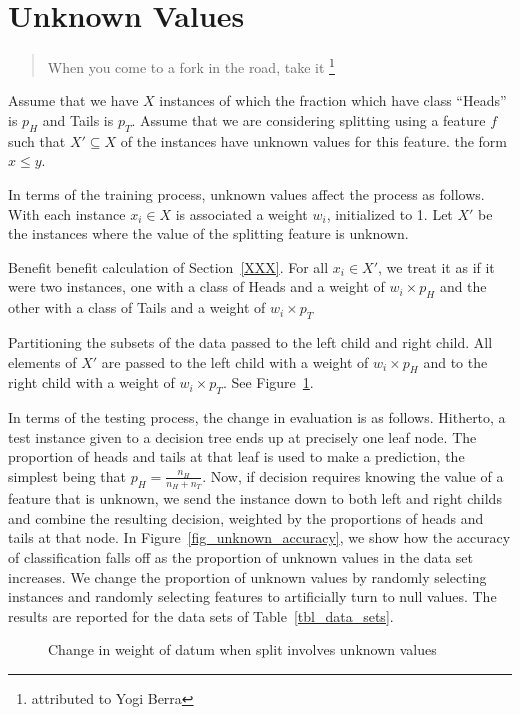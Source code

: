 \section{Unknown Values}
\label{unknowns}

\begin{quote}
When you come to a fork in the road, take it \footnote{attributed to Yogi Berra}
\end{quote}
Assume that we have \(X\) instances of which the fraction which have class
``Heads'' is \(p_H\) and Tails is \(p_T\).
Assume that we are considering splitting using
a feature \(f\) such that \(X' \subseteq X\) of the instances have unknown
values for this feature. 
the form \(x \leq y\). 

In terms of the training process, unknown values affect the process 
as follows.  With each instance \(x_i \in X\) is associated a weight \(w_i\),
initialized to 1. Let \(X'\) be the instances where the value of the splitting feature is unknown.

\be
\item Benefit benefit calculation of Section~\ref{XXX}. 
For all \(x_i \in X'\), we treat it as if it were two instances, one with a class of Heads and a weight of \(w_i \times p_H\) and the other with a class of Tails and a weight of \(w_i \times p_T\)
\item Partitioning the subsets of the data passed to the left child and right child.  All elements of \(X'\) are passed to the left child with a weight of \(w_i \times p_H\) and to the right child with a weight of \(w_i \times p_T\).  See Figure~\ref{fig_unknown_values}.
\ee

In terms of the testing process, the change in evaluation is as follows.
Hitherto, a test instance given to a decision tree ends up at precisely one leaf
node. The proportion of heads and tails at that leaf is used to make a
prediction, the simplest being that \(p_H = \frac{n_H}{n_H+n_T}\). Now, if
decision requires knowing the value of a feature that is unknown, we send the
instance down to both left and right childs and combine the resulting decision,
weighted by the proportions of heads and tails at that node. In
Figure~\ref{fig_unknown_accuracy}, we show how the accuracy of classification
falls off as the proportion of unknown values in the data set increases. We
change the proportion of unknown values by randomly selecting instances and
randomly selecting features to artificially turn to null values. The results are
reported for the data sets of Table~\ref{tbl_data_sets}.


\begin{figure}
\centering
{}
\label{fig_unknown_values}
\caption{Change in weight of datum when split involves unknown values}
\end{figure}




